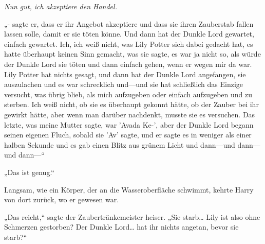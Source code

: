 \emph{Nun gut, ich akzeptiere den Handel.}

„- sagte er, dass er ihr Angebot akzeptiere und dass sie ihren Zauberstab fallen lassen solle, damit er sie töten könne. Und dann hat der Dunkle Lord gewartet, einfach gewartet. Ich, ich weiß nicht, was Lily Potter sich dabei gedacht hat, es hatte überhaupt keinen Sinn gemacht, was sie sagte, es war ja nicht so, als würde der Dunkle Lord sie töten und dann einfach gehen, wenn er wegen mir da war. Lily Potter hat nichts gesagt, und dann hat der Dunkle Lord angefangen, sie auszulachen und es war schrecklich und—und sie hat schließlich das Einzige versucht, was übrig blieb, als mich aufzugeben oder einfach aufzugeben und zu sterben. Ich weiß nicht, ob sie es überhaupt gekonnt hätte, ob der Zauber bei ihr gewirkt hätte, aber wenn man darüber nachdenkt, musste sie es versuchen. Das letzte, was meine Mutter sagte, war 'Avada Ke-', aber der Dunkle Lord begann seinen eigenen Fluch, sobald sie 'Av' sagte, und er sagte es in weniger als einer halben Sekunde und es gab einen Blitz aus grünem Licht und dann—und dann—und dann—“

„Das ist genug.“

Langsam, wie ein Körper, der an die Wasseroberfläche schwimmt, kehrte Harry von dort zurück, wo er gewesen war.

„Das reicht,“ sagte der Zaubertränkemeister heiser. „Sie starb… Lily ist also ohne Schmerzen gestorben? Der Dunkle Lord… hat ihr nichts angetan, bevor sie starb?“


